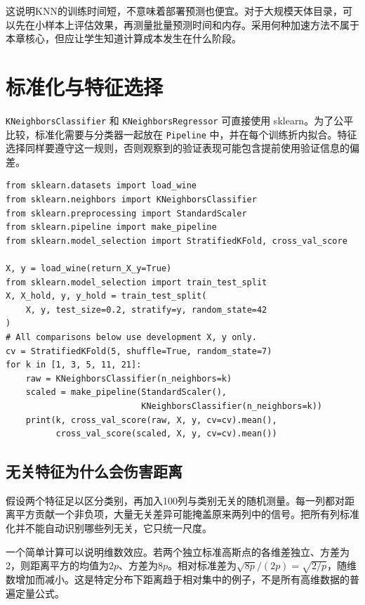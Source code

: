 这说明KNN的训练时间短，不意味着部署预测也便宜。对于大规模天体目录，可以先在小样本上评估效果，再测量批量预测时间和内存。采用何种加速方法不属于本章核心，但应让学生知道计算成本发生在什么阶段。

\section{标准化与特征选择}
\texttt{KNeighborsClassifier} 和 \texttt{KNeighborsRegressor} 可直接使用 sklearn。为了公平比较，标准化需要与分类器一起放在 \texttt{Pipeline} 中，并在每个训练折内拟合。特征选择同样要遵守这一规则，否则观察到的验证表现可能包含提前使用验证信息的偏差。

\begin{lstlisting}[caption={Wine 上对照邻居数与标准化}]
from sklearn.datasets import load_wine
from sklearn.neighbors import KNeighborsClassifier
from sklearn.preprocessing import StandardScaler
from sklearn.pipeline import make_pipeline
from sklearn.model_selection import StratifiedKFold, cross_val_score

X, y = load_wine(return_X_y=True)
from sklearn.model_selection import train_test_split
X, X_hold, y, y_hold = train_test_split(
    X, y, test_size=0.2, stratify=y, random_state=42
)
# All comparisons below use development X, y only.
cv = StratifiedKFold(5, shuffle=True, random_state=7)
for k in [1, 3, 5, 11, 21]:
    raw = KNeighborsClassifier(n_neighbors=k)
    scaled = make_pipeline(StandardScaler(),
                           KNeighborsClassifier(n_neighbors=k))
    print(k, cross_val_score(raw, X, y, cv=cv).mean(),
          cross_val_score(scaled, X, y, cv=cv).mean())
\end{lstlisting}

\subsection{无关特征为什么会伤害距离}
假设两个特征足以区分类别，再加入100列与类别无关的随机测量。每一列都对距离平方贡献一个非负项，大量无关差异可能掩盖原来两列中的信号。把所有列标准化并不能自动识别哪些列无关，它只统一尺度。

一个简单计算可以说明维数效应。若两个独立标准高斯点的各维差独立、方差为2，则距离平方的均值为$2p$、方差为$8p$。相对标准差为$\sqrt{8p}/(2p)=\sqrt{2/p}$，随维数增加而减小。这是特定分布下距离趋于相对集中的例子，不是所有高维数据的普遍定量公式。


